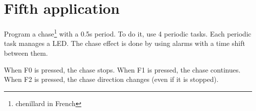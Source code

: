 \documentclass[11pt]{article}
\begin{document}
\section{Fifth application}

Program a chase\footnote{chenillard in French} with a 0.5s period. To do it, use 4 periodic tasks. Each periodic task manages a LED. The chase effect is done by using alarms with a time shift between them.

When F0 is pressed, the chase stops. When F1 is pressed, the chase continues. When F2 is pressed, the chase direction changes (even if it is stopped).
\end{document}
